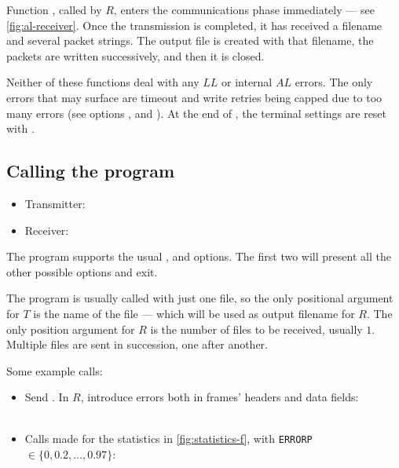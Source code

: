 \documentclass[main.tex]{subfiles}
\begin{document}
Function , called by $R$, enters the communications phase immediately --- see \autoref{fig:al-receiver}.
Once the transmission is completed, it has received a filename and several packet strings.
The output file is created with that filename, the packets are written successively, and then it is closed.

Neither of these functions deal with any $LL$ or internal $AL$ errors. The only errors that may surface are timeout and write retries being capped due to too many errors (see options ,  and ).
At the end of , the terminal settings are reset with .

\subsection{Calling the program}
\label{subsec:callusecases}

\begin{itemize}[noitemsep,rightmargin=3em]
	\item Transmitter:\\
	\item Receiver:\\
\end{itemize}

The program supports the usual ,  and  options. The first two will present all the other possible options and exit.

The program is usually called with just one file, so the only positional argument for $T$ is the name of the file --- which will be used as output filename for $R$. The only position argument for $R$ is the number of files to be received, usually $1$. Multiple files are sent in succession, one after another.

Some example calls:

\begin{itemize}[noitemsep,rightmargin=3em]
	\item Send . In $R$, introduce errors both in frames' headers and data fields:\\
	\\
	\item Calls made for the statistics in \autoref{fig:statistics-f}, with \texttt{ERRORP} $\in\{0,0.2,\ldots,0.97\}$:\\
	\\
	\\
\end{itemize}
\end{document}
